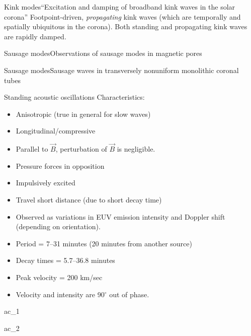 \documentclass[table]{beamer}
\begin{document}
\begin{frame}{Kink modes}{``Excitation and damping of broadband kink waves
    in the solar corona''}
    Footpoint-driven, \emph{propagating} kink waves (which are
    temporally and spatially ubiquitous in the corona).
    Both standing and propagating kink waves are rapidly damped.
\end{frame}%
\begin{frame}{Sausage modes}{Observations of sausage modes in magnetic pores}
\end{frame}%
\begin{frame}{Sausage modes}{Sausage waves in transversely nonuniform
    monolithic coronal tubes}
\end{frame}%
\begin{frame}{Standing acoustic oscillations}
    Characteristics:
    \begin{itemize}
        \item Anisotropic (true in general for slow waves)
        \item Longitudinal/compressive
        \item Parallel to $\vec{B}$, perturbation of $\vec{B}$ is negligible.
        \item Pressure forces in opposition
        \item Impulsively excited
        \item Travel short distance (due to short decay time)
        \item Observed as variations in EUV emission intensity and Doppler shift
            (depending on orientation).
        \item Period = 7--31 minutes (20 minutes from another source)
        \item Decay times = 5.7--36.8 minutes
        \item Peak velocity = 200 km/sec
        \item Velocity and intensity are 90$^{\circ}$ out of phase.
    \end{itemize}
\end{frame}%
\begin{frame}{ac\_1}
\end{frame}%
\begin{frame}{ac\_2}
\end{frame}%
\end{document}
